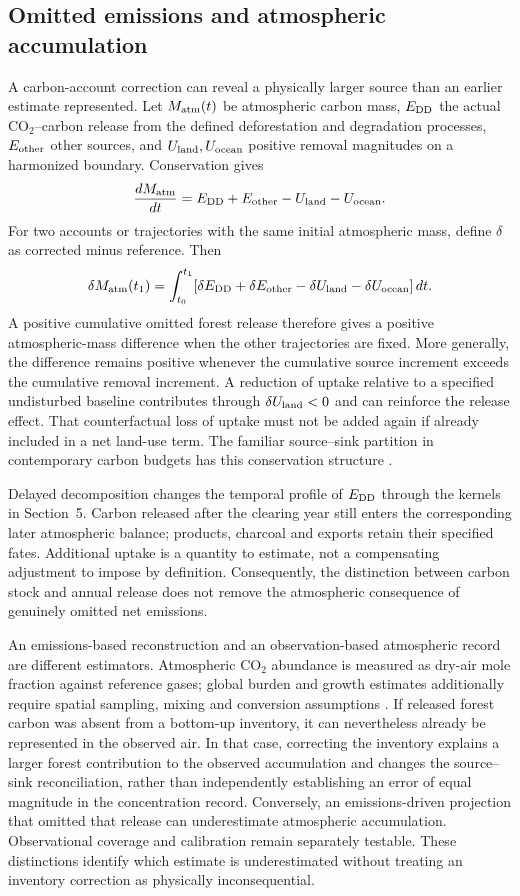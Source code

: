 \documentclass[11pt,a4paper]{article}
\newcommand{\COtwo}{\ensuremath{\mathrm{CO}_2}}
\theoremstyle{remark}
\begin{document}
\subsection{Omitted emissions and atmospheric accumulation}\label{sec:atmosphere}
A carbon-account correction can reveal a physically larger source than an earlier estimate represented. Let $M_{\rm atm}(t)$ be atmospheric carbon mass, $E_{\rm DD}$ the actual \COtwo{}--carbon release from the defined deforestation and degradation processes, $E_{\rm other}$ other sources, and $U_{\rm land},U_{\rm ocean}$ positive removal magnitudes on a harmonized boundary. Conservation gives
\[
 \frac{dM_{\rm atm}}{dt}=E_{\rm DD}+E_{\rm other}-U_{\rm land}-U_{\rm ocean}.
\]
For two accounts or trajectories with the same initial atmospheric mass, define $\delta$ as corrected minus reference. Then
\[
 \delta M_{\rm atm}(t_1)=\int_{t_0}^{t_1}
 [\delta E_{\rm DD}+\delta E_{\rm other}-\delta U_{\rm land}-\delta U_{\rm ocean}]\,dt.
\]
A positive cumulative omitted forest release therefore gives a positive atmospheric-mass difference when the other trajectories are fixed. More generally, the difference remains positive whenever the cumulative source increment exceeds the cumulative removal increment. A reduction of uptake relative to a specified undisturbed baseline contributes through $\delta U_{\rm land}<0$ and can reinforce the release effect. That counterfactual loss of uptake must not be added again if already included in a net land-use term. The familiar source--sink partition in contemporary carbon budgets has this conservation structure \citep{Friedlingstein2026}.

Delayed decomposition changes the temporal profile of $E_{\rm DD}$ through the kernels in Section~5. Carbon released after the clearing year still enters the corresponding later atmospheric balance; products, charcoal and exports retain their specified fates. Additional uptake is a quantity to estimate, not a compensating adjustment to impose by definition. Consequently, the distinction between carbon stock and annual release does not remove the atmospheric consequence of genuinely omitted net emissions.

An emissions-based reconstruction and an observation-based atmospheric record are different estimators. Atmospheric CO$_2$ abundance is measured as dry-air mole fraction against reference gases; global burden and growth estimates additionally require spatial sampling, mixing and conversion assumptions \citep{NOAAMeasurements,Friedlingstein2026}. If released forest carbon was absent from a bottom-up inventory, it can nevertheless already be represented in the observed air. In that case, correcting the inventory explains a larger forest contribution to the observed accumulation and changes the source--sink reconciliation, rather than independently establishing an error of equal magnitude in the concentration record. Conversely, an emissions-driven projection that omitted that release can underestimate atmospheric accumulation. Observational coverage and calibration remain separately testable. These distinctions identify which estimate is underestimated without treating an inventory correction as physically inconsequential.
\end{document}
